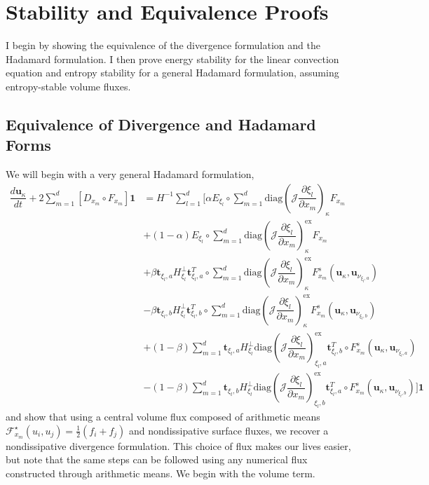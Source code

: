 \documentclass[12pt,a4paper]{article}
\newcommand{\pder}[2][]{\dfrac{\partial #1}{\partial #2}} %
\newcommand{\der}[2][]{\dfrac{d #1}{d #2}} %
\newcommand{\fn}[1]{\mathcal{#1}} %
\begin{document}
\newpage

\section{Stability and Equivalence Proofs}

I begin by showing the equivalence of the divergence formulation and the Hadamard formulation. I then prove energy stability for the linear convection equation and entropy stability for a general Hadamard formulation, assuming entropy-stable volume fluxes.

\subsection{Equivalence of Divergence and Hadamard Forms}

We will begin with a very general Hadamard formulation,
\begin{align*}
\der[\bm{u}_\kappa]{t} + 2 \sum_{m=1}^d \left[ D_{x_m} \circ F_{x_m} \right] \bm{1}  
&= H^{-1} \sum_{l=1}^d \Bigg[ \alpha E_{\xi_l} \circ \sum_{m=1}^d \text{diag} \left( \fn{J} \pder[\xi_l]{x_m} \right)_{\kappa} F_{x_m} \\
& + (1-\alpha) E_{\xi_l} \circ \sum_{m=1}^d \text{diag} \left( \fn{J} \pder[\xi_l]{x_m} \right)_{\kappa}^\text{ex} F_{x_m} \\
& + \beta \bm{t}_{\xi_l, a} H^{\bot}_{\xi_l} \bm{t}_{\xi_l, a}^T \circ \sum_{m=1}^d \text{diag} \left( \fn{J} \pder[\xi_l]{x_m} \right)_{\kappa}^\text{ex} F^s_{x_m} (\bm{u}_\kappa, \bm{u}_{\nu_{\xi_l,a}}) \\
&  -  \beta \bm{t}_{\xi_l, b} H^{\bot}_{\xi_l} \bm{t}_{\xi_l, b}^T \circ \sum_{m=1}^d \text{diag} \left( \fn{J} \pder[\xi_l]{x_m} \right)_{\kappa}^\text{ex} F^s_{x_m} (\bm{u}_\kappa, \bm{u}_{\nu_{\xi_l,b}}) \\
&  + (1- \beta) \sum_{m=1}^d \bm{t}_{\xi_l, a} H^{\bot}_{\xi_l} \text{diag} \left( \fn{J} \pder[\xi_l]{x_m} \right)_{\xi_l,a}^\text{ex} \bm{t}_{\xi_l, b}^T \circ  F^s_{x_m} (\bm{u}_\kappa, \bm{u}_{\nu_{\xi_l,a}}) \\
& - (1- \beta)\sum_{m=1}^d \bm{t}_{\xi_l, b} H^{\bot}_{\xi_l}  \text{diag} \left( \fn{J} \pder[\xi_l]{x_m} \right)_{\xi_l,b}^\text{ex} \bm{t}_{\xi_l, a}^T \circ F^s_{x_m} (\bm{u}_\kappa, \bm{u}_{\nu_{\xi_l,b}})
\Bigg] \bm{1}
\end{align*}
and show that using a central volume flux composed of arithmetic means $ \fn{F}^\star_{x_m} (u_i, u_j) = \frac{1}{2}(f_i + f_j) $ and nondissipative surface fluxes, we recover a nondissipative divergence formulation. This choice of flux makes our lives easier, but note that the same steps can be followed using any numerical flux constructed through arithmetic means. We begin with the volume term.
\end{document}
